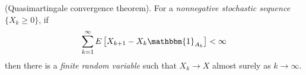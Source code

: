 \begin{enumerate}
	      \begin{theorem}{(Quasimartingale convergence theorem).}
		      For a \textit{nonnegative stochastic sequence} $\{X_{k} \ge 0\}$, if
		      \begin{equation*}
			      \sum_{k=1}^{\infty}E \left[X_{k+1}-X_{k}\mathbbm{1}_{A_{k}}\right] < \infty
		      \end{equation*}
		      then there is a \textit{finite random variable} such that $X_{k} \to X$ almost surely as $k \to \infty$.
	      \end{theorem}
\end{enumerate}

